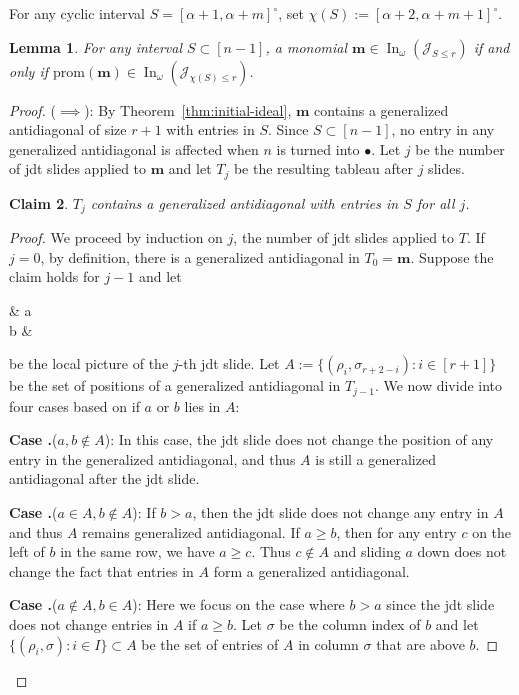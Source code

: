 \documentclass[12pt,reqno]{amsart}
\newtheorem{lemma}{Lemma}[section]
\newtheorem{claim}[lemma]{Claim}
\theoremstyle{definition}
\newcommand{\inn}{\operatorname{In}}
\newcommand{\RNum}[1]{\uppercase\expandafter{\romannumeral #1\relax}}
\newcommand{\mm}{\mathbf m}
\newcommand{\cJ}{\mathcal{J}}
\begin{document}
{For any cyclic interval $S = [\alpha+1,\alpha+m]^\circ$, set $\chi(S):=[\alpha+2,\alpha+m+1]^\circ$. 

\begin{lemma}\label{lemma:jdtantidiag}
    For any interval $S\subset [n-1]$, a monomial $\mm\in \inn_\omega(\cJ_{S\leq r})$ if and only if $\mathrm{prom}(\mm) \in \inn_\omega(\cJ_{\chi(S)\leq r})$.
\end{lemma}
\begin{proof}
    ($\implies$):
    By Theorem~\ref{thm:initial-ideal}, $\mm$ contains a generalized antidiagonal of size $r+1$ with entries in $S$. 
    Since $S\subset [n-1]$, no entry in any generalized antidiagonal is affected when $n$ is turned into $\bullet$. Let $j$ be the number of jdt slides applied to $\mm$ and let $T_j$ be the resulting tableau after $j$ slides. 

    \begin{claim}\label{claim:genanti}
       $T_j$ contains a generalized antidiagonal with entries in $S$ for all $j$. 
    \end{claim}
    \begin{proof}
        We proceed by induction on $j$, the number of jdt slides applied to $T$. If $j = 0$, by definition, there is a generalized antidiagonal in $T_0 = \mm$. Suppose the claim holds for $j-1$ and let 
    \begin{ytableau}
        \none & a\\
        b & \bullet
    \end{ytableau} be the local picture of the $j$-th jdt slide. Let $A :=\{(\rho_{i},\sigma_{r+2-i}):i\in [r+1]\}$ be the set of positions of a generalized antidiagonal in $T_{j-1}$. We now divide into four cases based on if $a$ or $b$ lies in $A$:

    \noindent\textbf{Case \RNum{1}.}($a,b\notin A$): In this case, the jdt slide does not change the position of any entry in the generalized antidiagonal, and thus $A$ is still a generalized antidiagonal after the jdt slide. 

    \noindent\textbf{Case \RNum{2}.}($a\in A,b\notin A$): If $b>a$, then the jdt slide does not change any entry in $A$ and thus $A$ remains generalized antidiagonal. If $a\geq b$, then for any entry $c$ on the left of $b$ in the same row, we have $a\geq c$. Thus $c\notin A$ and sliding $a$ down does not change the fact that entries in $A$ form a generalized antidiagonal.
   

    \noindent\textbf{Case \RNum{3}.}($a\notin A,b\in A$): Here we focus on the case where $b>a$ since the jdt slide does not change entries in $A$ if $a\geq b$. Let $\sigma$ be the column index of $b$ and let $\{(\rho_i,\sigma):i\in I\}\subset A$ be the set of entries of $A$ in column $\sigma$ that are above $b$.
    

\end{proof}
\end{proof}}
\end{document}

